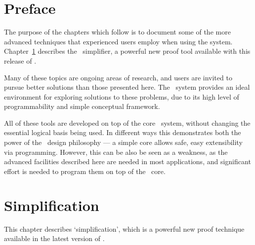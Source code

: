 \chapter*{Preface}

The purpose of the chapters which follow is to document some of the 
more advanced techniques that experienced users employ 
when using the \HOL system.
Chapter~\ref{simplification} describes the \HOL\ simplifier, a 
powerful new proof tool available with this release of \HOL.  


Many of these topics are ongoing areas of research, and users are 
invited to pursue better solutions than those 
presented here.  The \HOL\ system provides an
ideal environment for exploring solutions to these problems,
due to its high level of programmability and simple conceptual
framework.

All of these tools are developed on top of the
core \HOL\ system, without changing the essential logical
basis being used.  In different ways this demonstrates both
the power of the \HOL\ design philosophy --- a
simple core allows safe, easy extensibility via programming.
However, this can be also be seen as a weakness, as the advanced
facilities described here are needed in most applications, and 
significant effort is needed to program them on top of the \HOL\ core.



\chapter{Simplification}

\label{simplification}
\label{simplifier}

This chapter describes `simplification', which is a 
powerful new proof technique available in the latest version
of \HOL.  

